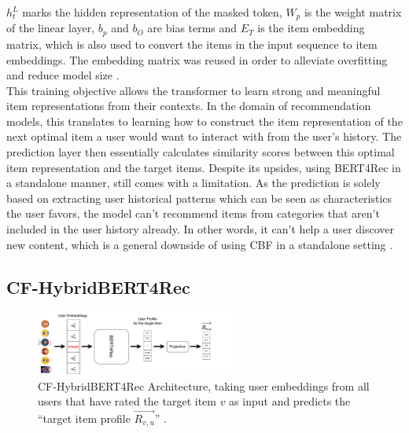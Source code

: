 \documentclass{Academic}
\begin{document}
        $h_t^L$ marks the hidden representation of the masked token, $W_p$ is the weight matrix of the linear layer, $b_p$ and $b_O$ are bias terms and $E_T$ is the item embedding matrix, which is also used to convert the items in the input sequence to item embeddings. The embedding matrix was reused in order to alleviate overfitting and reduce model size \cite{sunBERT4RecSequentialRecommendation2019}. \\
        This training objective allows the transformer to learn strong and meaningful item representations from their contexts. In the domain of recommendation models, this translates to learning how to construct the item representation of the next optimal item a user would want to interact with from the user's history. The prediction layer then essentially calculates similarity scores between this optimal item representation and the target items. Despite its upsides, using BERT4Rec in a standalone manner, still comes with a limitation. As the prediction is solely based on extracting user historical patterns which can be seen as characteristics the user favors, the model can't recommend items from categories that aren't included in the user history already. In other words, it can't help a user discover new content, which is a general downside of using CBF in a standalone setting \cite{channarongHybridBERT4RecHybridContentBased2022}.

        \subsection{CF-HybridBERT4Rec}
        \begin{figure}[ht!]
            \centering
            \includegraphics[width=0.6\textwidth]{images/CF-HybridBERT4Rec.pdf}
            \caption{CF-HybridBERT4Rec Architecture, taking user embeddings from all users that have rated the target item $v$ as input and predicts the \enquote{target item profile $\overrightarrow{R_{v,u}}$} \cite{channarongHybridBERT4RecHybridContentBased2022}.}
            \label{fig:cf-arch}
        \end{figure}
\end{document}

